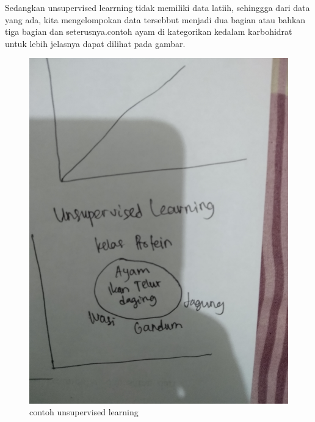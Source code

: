 \begin{enumerate}
Sedangkan unsupervised learrning tidak memiliki data latiih, sehinggga dari data yang ada, kita mengelompokan data tersebbut menjadi dua bagian atau bahkan tiga bagian dan seterusnya.contoh ayam di kategorikan kedalam karbohidrat untuk lebih jelasnya dapat dilihat pada gambar.\par
\begin{figure}[ht]
\centering
\includegraphics[scale=0.01]{figures/1174050/chapter2/3.jpg}
\caption{contoh unsupervised learning}
\label{contoh}
\end{figure}


\end{enumerate}
